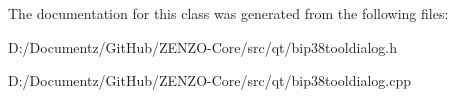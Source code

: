 The documentation for this class was generated from the following files\+:\begin{DoxyCompactItemize}
\item 
D\+:/\+Documentz/\+Git\+Hub/\+Z\+E\+N\+Z\+O-\/\+Core/src/qt/bip38tooldialog.\+h\item 
D\+:/\+Documentz/\+Git\+Hub/\+Z\+E\+N\+Z\+O-\/\+Core/src/qt/bip38tooldialog.\+cpp\end{DoxyCompactItemize}
